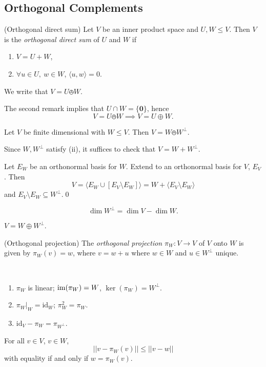 \documentclass{article}
\renewcommand{\id}{\mathrm{id}}
\begin{document}
\subsection{Orthogonal Complements}
\begin{definition}
	(Orthogonal direct sum) Let $ V $ be an inner product space and $ U,W\le V $. Then $ V $ is the \textit{orthogonal direct sum} of $ U $ and $ W $ if
	\begin{enumerate}
		\item $ V=U+W $,
		\item $ \forall u\in U,\ w\in W $, $ \langle u,w\rangle=0 $.
	\end{enumerate}
	We write that $ V=U\obot W $.
\end{definition}
\begin{remark}
	The second remark implies that $ U\cap W=\{\mathbf 0\} $, hence
	\[
	  V=U\obot W\implies V=U\oplus W.
	\]
\end{remark}
\begin{lemma}
  Let $ V $ be finite dimensional with $ W\le V $. Then $ V=W\obot W^\perp $.
\end{lemma}
\pf Since $ W,W^\perp $ satisfy (ii), it suffices to check that $ V=W+W^\perp $.\par
Let $ E_W $ be an orthonormal basis for $ W $. Extend to an orthonormal basis for $ V $, $ E_V $. Then
\[
	V=\langle E_W\cup [E_V\setminus E_W]\rangle=W+\langle E_V\setminus E_W\rangle
\]
and $ E_V\setminus E_W\subseteq W^\perp $.\qed
\begin{corollary}
  \[
    \dim W^\perp = \dim V-\dim W.
  \]
\end{corollary}
\pf $ V=W\oplus W^\perp $.
\begin{definition}
	(Orthogonal projection) The \textit{orthogonal projection} $ \pi_W:V\to V $ of $ V $ onto $ W $ is given by $ \pi_W(v)=w $, where $ v=w+u $ where $ w\in W $ and $ u\in W^\perp $ unique.
\end{definition}
\begin{remark}
  \ 
  \begin{enumerate}
	  \item $ \pi_W $ is linear; $ \operatorname{im}(\pi_W)=W $, $ \ker(\pi_W)=W^\perp $.
	  \item $ \pi_W|_W=\id_W $; $ \pi^2_W=\pi_W $.
	  \item $ \id_V-\pi_W =\pi_{W^\perp} $.
  \end{enumerate}
\end{remark}
\begin{proposition}
  For all $ v\in V $, $ v\in W $,
  \[
    ||v-\pi_W(v)||\le ||v-w||
  \]
  with equality if and only if $ w=\pi_W(v) $.
\end{proposition}
\end{document}
